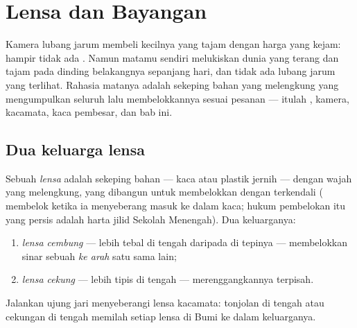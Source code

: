 \chapter{Lensa dan Bayangan}\label{ch:g8:lenses-images}

Kamera lubang jarum membeli  kecilnya yang tajam dengan harga
yang kejam: hampir tidak ada . Namun matamu sendiri melukiskan
dunia yang terang dan tajam pada dinding belakangnya sepanjang hari,
dan tidak ada lubang jarum yang terlihat. Rahasia matanya adalah
sekeping bahan  yang melengkung yang mengumpulkan seluruh 
lalu membelokkannya sesuai pesanan --- itulah ,  kamera,
kacamata, kaca pembesar, dan bab ini.

\section{Dua keluarga lensa}

\begin{definition}\label{def:g8:lenses-images:families}
Sebuah \emph{lensa} adalah sekeping bahan  ---
kaca atau plastik jernih --- dengan wajah yang melengkung, yang
dibangun untuk membelokkan  dengan terkendali ( membelok
ketika ia menyeberang masuk ke dalam kaca; hukum pembelokan itu yang
persis adalah harta jilid Sekolah Menengah). Dua keluarganya:
\begin{enumerate}
  \item \emph{lensa cembung} --- lebih tebal di
        tengah daripada di tepinya --- membelokkan sinar sebuah 
        \emph{ke arah} satu sama lain;
  \item \emph{lensa cekung} --- lebih tipis di
        tengah --- merenggangkannya terpisah.
\end{enumerate}
Jalankan ujung jari menyeberangi lensa kacamata: tonjolan di tengah
atau cekungan di tengah memilah setiap lensa di Bumi ke dalam
keluarganya.
\end{definition}


